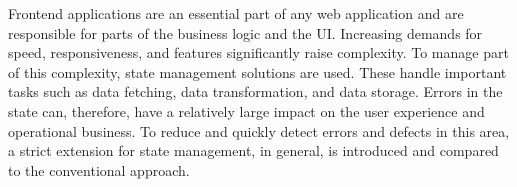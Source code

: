 Frontend applications are an essential part of any web application and are responsible for parts of the business logic and the UI. Increasing demands for speed, responsiveness, and features significantly raise complexity. To manage part of this complexity, state management solutions are used. These handle important tasks such as data fetching, data transformation, and data storage. Errors in the state can, therefore, have a relatively large impact on the user experience and operational business. To reduce and quickly detect errors and defects in this area, a strict extension for state management, in general, is introduced and compared to the conventional approach.